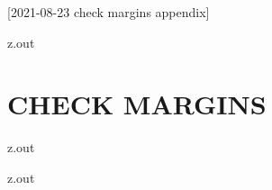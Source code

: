 [2021-08-23 check margins appendix]

\begin{VerbatimOut}{z.out}
\chapter{CHECK MARGINS}
\end{VerbatimOut}

\MyIO


\begin{VerbatimOut}{z.out}

\end{VerbatimOut}

\MyIO


\begin{VerbatimOut}{z.out}
{
  \tiny
}
\end{VerbatimOut}

